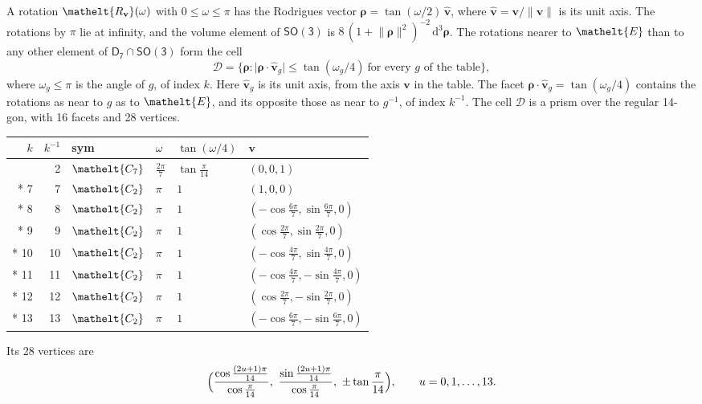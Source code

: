 \documentclass[10pt,a4paper]{article}
\numberwithin{equation}{section}
\newcommand{\eltfont}[1]{{\let\sigma\eltsigma\mathelt{#1}}}
\newcommand{\grp}[1]{\mathsf{#1}}
\newcommand{\cls}[1]{\eltfont{#1}}
\newcommand{\elt}[1]{\eltfont{#1}}
\newcommand{\dirvec}[3]{(#1, #2, #3)}
\newcommand{\unitaxis}{\hat{\mathbf{v}}}
\newcommand{\vv}{\mathbf{v}}
\newcommand{\diff}{\mathrm{d}}
\newcommand{\rodrigues}{\boldsymbol{\rho}}
\newcommand{\fcell}{\mathcal{D}}
\begin{document}
\leavevmode\label{n:vector.rodrigues}\label{n:vector.unitaxis}A rotation $\elt{R_{\vv}}(\omega)$ with $0 \le \omega \le \pi$ has the Rodrigues vector $\rodrigues = \tan(\omega/2)\,\unitaxis$, where $\unitaxis = \vv/\lVert\vv\rVert$ is its unit axis. The rotations by $\pi$ lie at infinity, and the volume element of \href{SO3.pdf}{$\grp{SO(3)}$} is $8\,(1 + \lVert\rodrigues\rVert^2)^{-2}\,\diff^3\rodrigues$.
\leavevmode\label{n:set.cell}The rotations nearer to $\elt{E}$ than to any other element of $\grp{D_{7}} \cap \grp{SO(3)}$ form the cell
\begin{equation}\label{e:cell}\fcell = \bigl\{\rodrigues : \lvert\rodrigues\cdot\unitaxis_g\rvert \le \tan(\omega_g/4)\ \text{for every $g$ of the table}\bigr\},\end{equation}
where $\omega_g \le \pi$ is the angle of $g$, of index $k$. Here $\unitaxis_g$ is its unit axis, from the axis $\vv$ in the table. The facet $\rodrigues\cdot\unitaxis_g = \tan(\omega_g/4)$ contains the rotations as near to $g$ as to $\elt{E}$, and its opposite those as near to $g^{-1}$, of index $k^{-1}$. The cell $\fcell$ is a prism over the regular 14-gon, with 16 facets and 28 vertices.
{\small{\renewcommand{\arraystretch}{1.3}\begin{longtable}{@{}rrllll@{}}\toprule
$k$ & $k^{-1}$ & sym & $\omega$ & $\tan(\omega/4)$ & $\vv$\\\midrule\endhead
\bottomrule\endfoot\endlastfoot
1 & 2 & $\cls{C_{7}}$ & $\tfrac{2\pi}{7}$ & $\tan\tfrac{\pi}{14}$ & $\dirvec{0}{0}{1}$\\*
7 & 7 & $\cls{C_{2}}$ & $\pi$ & $1$ & $\dirvec{1}{0}{0}$\\*
8 & 8 & $\cls{C_{2}}$ & $\pi$ & $1$ & $\dirvec{-\cos\tfrac{6\pi}{7}}{\sin\tfrac{6\pi}{7}}{0}$\\*
9 & 9 & $\cls{C_{2}}$ & $\pi$ & $1$ & $\dirvec{\cos\tfrac{2\pi}{7}}{\sin\tfrac{2\pi}{7}}{0}$\\*
10 & 10 & $\cls{C_{2}}$ & $\pi$ & $1$ & $\dirvec{-\cos\tfrac{4\pi}{7}}{\sin\tfrac{4\pi}{7}}{0}$\\*
11 & 11 & $\cls{C_{2}}$ & $\pi$ & $1$ & $\dirvec{-\cos\tfrac{4\pi}{7}}{-\sin\tfrac{4\pi}{7}}{0}$\\*
12 & 12 & $\cls{C_{2}}$ & $\pi$ & $1$ & $\dirvec{\cos\tfrac{2\pi}{7}}{-\sin\tfrac{2\pi}{7}}{0}$\\*
13 & 13 & $\cls{C_{2}}$ & $\pi$ & $1$ & $\dirvec{-\cos\tfrac{6\pi}{7}}{-\sin\tfrac{6\pi}{7}}{0}$\\
\bottomrule\end{longtable}}}
\leavevmode\label{n:local.vertex.u}Its 28 vertices are
\begin{equation}\label{e:prism}\Bigl(\frac{\cos\frac{(2u+1)\pi}{14}}{\cos\frac{\pi}{14}},\ \frac{\sin\frac{(2u+1)\pi}{14}}{\cos\frac{\pi}{14}},\ \pm\tan\frac{\pi}{14}\Bigr),\qquad u = 0, 1, \dots, 13.\end{equation}
\end{document}
